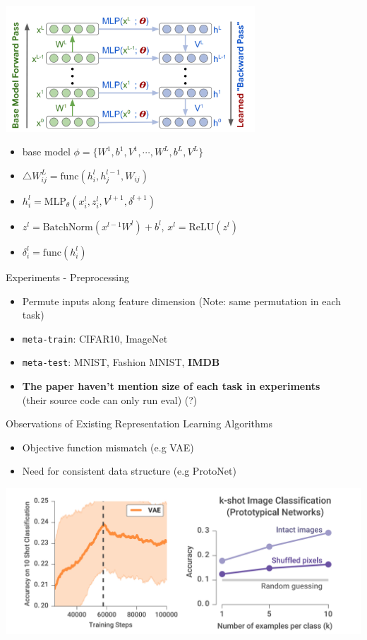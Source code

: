 \documentclass{beamer}
\begin{document}
\begin{frame}
  \center \includegraphics[width=0.7\textwidth]{fig/update-rule.png}
  \begin{itemize}
    \item base model $\phi = \lbrace W^1,b^1,V^1,\cdots,W^L,b^L,V^L \rbrace$
    \item $\triangle W_{ij}^L = \text{func}(h_i^l,h_j^{l-1}, W_{ij})$
    \item $h_i^l = \text{MLP}_\theta(x^l_i,z_i^l,V^{l+1},\delta^{l+1})$
    \item $z^l = \text{BatchNorm}(x^{l-1}W^l) + b^l$, $x^l = \text{ReLU}(z^l)$
    \item $\delta_i^l = \text{func}(h_i^l)$
  \end{itemize}
\end{frame}


\begin{frame}{Experiments - Preprocessing}
  \begin{itemize}
    \item Permute inputs along feature dimension (Note: same permutation in each task)
    \item \texttt{meta-train}: CIFAR10, ImageNet
    \item \texttt{meta-test}: MNIST, Fashion MNIST, \textbf{IMDB}
  \item \textbf{The paper haven't mention size of each task in experiments} \\
    (their source code can only run eval) (?)
  \end{itemize}
\end{frame}

\begin{frame}{Observations of Existing Representation Learning Algorithms}
  \begin{itemize}
    \item Objective function mismatch (e.g VAE)
    \item Need for consistent data structure (e.g ProtoNet)
  \end{itemize}
  \center \includegraphics[width=\textwidth]{fig/obs.png}
\end{frame}
\end{document}
